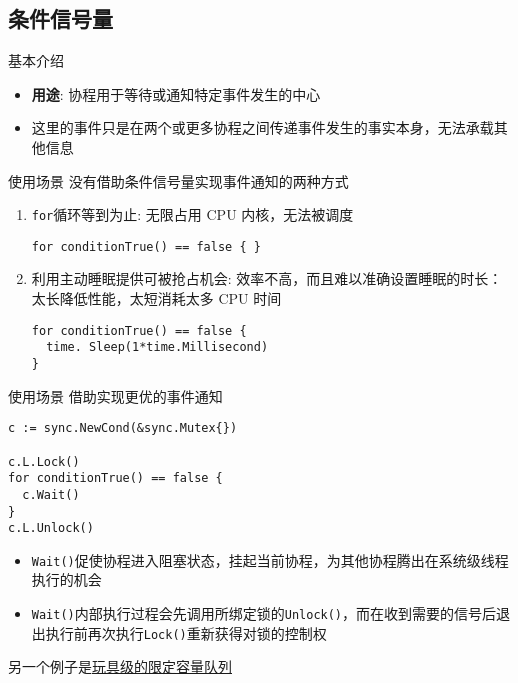 \subsection{条件信号量\Cond}
\begin{frame}{基本介绍}
    \begin{itemize}
        \item \textbf{用途}: 协程用于等待或通知特定事件发生的中心
        \item 这里的事件只是在两个或更多协程之间传递事件发生的事实本身，\alert{无法承载其他信息}
    \end{itemize}
\end{frame}

\begin{frame}[fragile]{使用场景}
   没有借助条件信号量实现事件通知的两种方式
   
   \begin{enumerate}
       \item \texttt{for}循环等到为止: 无限占用 CPU 内核，\alert{无法被调度}
\begin{lstlisting}
for conditionTrue() == false { }    
\end{lstlisting}
       \item 利用主动睡眠提供可被抢占机会: \alert{效率不高}，而且难以准确设置睡眠的时长：太长降低性能，太短消耗太多 CPU 时间    
\begin{lstlisting}
for conditionTrue() == false {
  time. Sleep(1*time.Millisecond)
}
\end{lstlisting}
   \end{enumerate}
\end{frame}

\begin{frame}[fragile]{使用场景}
   借助\Cond 实现更优的事件通知
\begin{lstlisting}
c := sync.NewCond(&sync.Mutex{})

c.L.Lock()
for conditionTrue() == false {
  c.Wait()
}
c.L.Unlock()
\end{lstlisting}

\begin{itemize}
    \item \texttt{Wait()}促使协程进入阻塞状态，挂起当前协程，为其他协程腾出在系统级线程执行的机会
    \item \texttt{Wait()}内部执行过程会先调用所绑定锁的\texttt{Unlock()}，而在收到需要的信号后退出执行前再次执行\texttt{Lock()}重新获得对锁的控制权
\end{itemize}

另一个例子是\href{https://github.com/sammyne/concurrency-in-go/blob/master/chapter03/sync.pkg/cond/queue.go}{玩具级的限定容量队列}
\end{frame}

